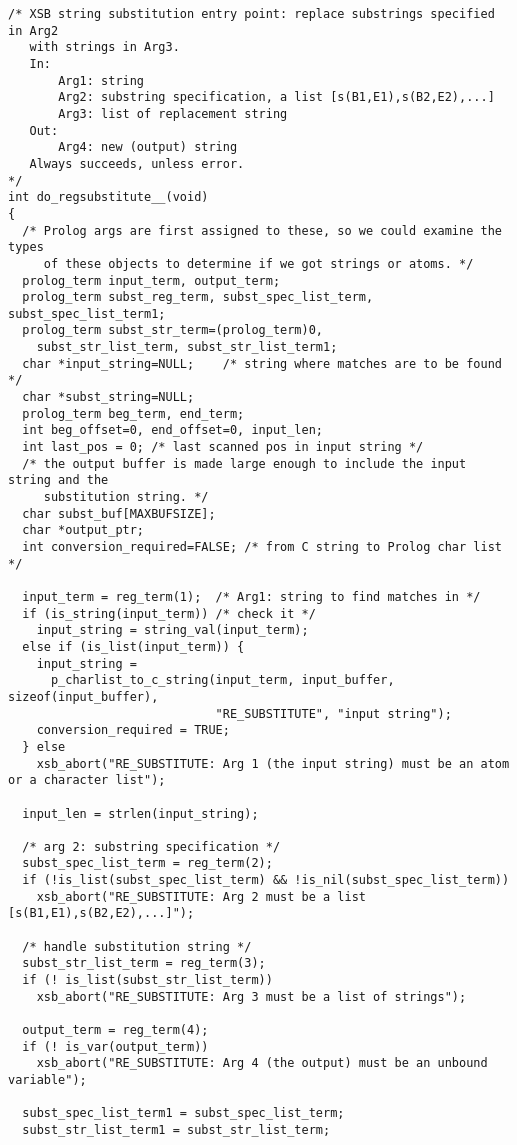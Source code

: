 \begin{verbatim}
/* XSB string substitution entry point: replace substrings specified in Arg2
   with strings in Arg3.
   In: 
       Arg1: string
       Arg2: substring specification, a list [s(B1,E1),s(B2,E2),...]
       Arg3: list of replacement string
   Out:
       Arg4: new (output) string
   Always succeeds, unless error.
*/
int do_regsubstitute__(void)
{
  /* Prolog args are first assigned to these, so we could examine the types
     of these objects to determine if we got strings or atoms. */
  prolog_term input_term, output_term;
  prolog_term subst_reg_term, subst_spec_list_term, subst_spec_list_term1;
  prolog_term subst_str_term=(prolog_term)0,
    subst_str_list_term, subst_str_list_term1;
  char *input_string=NULL;    /* string where matches are to be found */
  char *subst_string=NULL;
  prolog_term beg_term, end_term;
  int beg_offset=0, end_offset=0, input_len;
  int last_pos = 0; /* last scanned pos in input string */
  /* the output buffer is made large enough to include the input string and the
     substitution string. */
  char subst_buf[MAXBUFSIZE];
  char *output_ptr;
  int conversion_required=FALSE; /* from C string to Prolog char list */

  input_term = reg_term(1);  /* Arg1: string to find matches in */
  if (is_string(input_term)) /* check it */
    input_string = string_val(input_term);
  else if (is_list(input_term)) {
    input_string =
      p_charlist_to_c_string(input_term, input_buffer, sizeof(input_buffer),
                             "RE_SUBSTITUTE", "input string");
    conversion_required = TRUE;
  } else
    xsb_abort("RE_SUBSTITUTE: Arg 1 (the input string) must be an atom or a character list");

  input_len = strlen(input_string);

  /* arg 2: substring specification */
  subst_spec_list_term = reg_term(2);
  if (!is_list(subst_spec_list_term) && !is_nil(subst_spec_list_term))
    xsb_abort("RE_SUBSTITUTE: Arg 2 must be a list [s(B1,E1),s(B2,E2),...]");

  /* handle substitution string */
  subst_str_list_term = reg_term(3);
  if (! is_list(subst_str_list_term))
    xsb_abort("RE_SUBSTITUTE: Arg 3 must be a list of strings");

  output_term = reg_term(4);
  if (! is_var(output_term))
    xsb_abort("RE_SUBSTITUTE: Arg 4 (the output) must be an unbound variable");

  subst_spec_list_term1 = subst_spec_list_term;
  subst_str_list_term1 = subst_str_list_term;


\end{verbatim}
